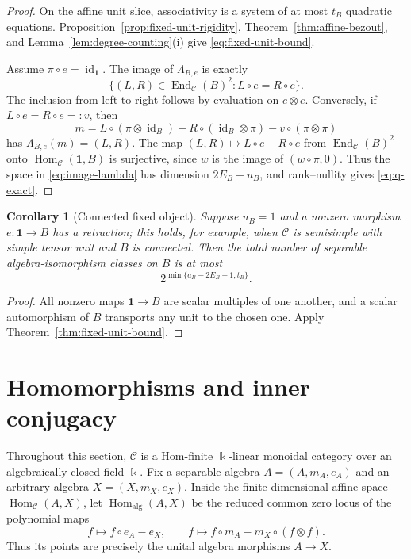 \documentclass[11pt]{amsart}
\newtheorem{corollary}[theorem]{Corollary}
\theoremstyle{definition}
\theoremstyle{remark}
\newcommand{\C}{\mathcal C}
\newcommand{\one}{\mathbf 1}
\newcommand{\kk}{\Bbbk}
\DeclareMathOperator{\Hom}{Hom}
\DeclareMathOperator{\End}{End}
\DeclareMathOperator{\id}{id}
\begin{document}
\begin{proof}
On the affine unit slice, associativity is a system of at most $t_B$
quadratic equations.  Proposition~\ref{prop:fixed-unit-rigidity},
Theorem~\ref{thm:affine-bezout}, and
Lemma~\ref{lem:degree-counting}\textup{(i)} give
\eqref{eq:fixed-unit-bound}.

Assume $\pi\circ e=\id_{\one}$.  The image of
$\Lambda_{B,e}$ is exactly
\begin{equation}\label{eq:image-lambda}
 \{(L,R)\in\End_{\C}(B)^2:L\circ e=R\circ e\}.
\end{equation}
The inclusion from left to right follows by evaluation on
$e\otimes e$.  Conversely, if $L\circ e=R\circ e=:v$, then
\[
 m=L\circ(\pi\otimes\id_B)
   +R\circ(\id_B\otimes\pi)
   -v\circ(\pi\otimes\pi)
\]
has $\Lambda_{B,e}(m)=(L,R)$.  The map
$(L,R)\mapsto L\circ e-R\circ e$ from $\End_{\C}(B)^2$ onto
$\Hom_{\C}(\one,B)$ is surjective, since $w$ is the image of
$(w\circ\pi,0)$.  Thus the space in \eqref{eq:image-lambda} has
dimension $2E_B-u_B$, and rank--nullity gives \eqref{eq:q-exact}.
\end{proof}

\begin{corollary}[Connected fixed object]\label{cor:connected-fixed-object}
Suppose $u_B=1$ and a nonzero morphism $e:\one\to B$ has a retraction;
this holds, for example, when $\C$ is semisimple with simple tensor unit
and $B$ is connected.
Then the total number of separable algebra-isomorphism classes on $B$ is at
most
\begin{equation}\label{eq:connected-fixed-object}
 2^{\min\{a_B-2E_B+1,t_B\}}.
\end{equation}
\end{corollary}

\begin{proof}
All nonzero maps $\one\to B$ are scalar multiples of one another, and a
scalar automorphism of $B$ transports any unit to the chosen one.  Apply
Theorem~\ref{thm:fixed-unit-bound}.
\end{proof}
\section{Homomorphisms and inner conjugacy}\label{sec:homomorphisms}

Throughout this section, $\C$ is a Hom-finite $\kk$-linear monoidal
category over an algebraically closed field $\kk$.  Fix a separable algebra
$A=(A,m_A,e_A)$ and an arbitrary algebra $X=(X,m_X,e_X)$.  Inside the
finite-dimensional affine space
$\Hom_{\C}(A,X)$, let $\Hom_{\mathrm{alg}}(A,X)$ be the reduced common zero
locus of the polynomial maps
\[
  f\longmapsto f\circ e_A-e_X,
  \qquad
  f\longmapsto f\circ m_A-m_X\circ(f\otimes f).
\]
Thus its points are precisely the unital algebra morphisms $A\to X$.
\end{document}
